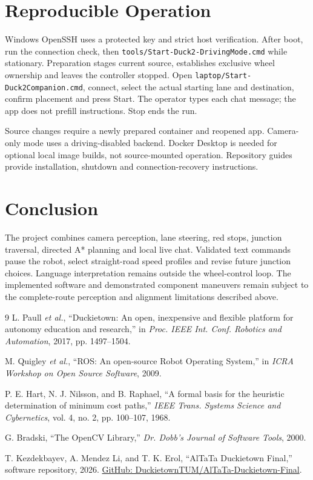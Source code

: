 \documentclass[10pt,a4paper,twocolumn]{article}
\newcommand{\code}[1]{\texttt{#1}}
\begin{document}
\section{Reproducible Operation}

Windows OpenSSH uses a protected key and strict host verification. After boot,
run the connection check, then \code{tools/Start-Duck2-DrivingMode.cmd} while
stationary. Preparation stages current source, establishes exclusive wheel
ownership and leaves the controller stopped. Open
\code{laptop/Start-Duck2Companion.cmd}, connect, select the actual starting lane
and destination, confirm placement and press Start. The operator types each
chat message; the app does not prefill instructions. Stop ends the run.

Source changes require a newly prepared container and reopened app. Camera-only
mode uses a driving-disabled backend. Docker Desktop is needed for optional
local image builds, not source-mounted operation. Repository guides provide
installation, shutdown and connection-recovery instructions.

\section{Conclusion}

The project combines camera perception, lane steering, red stops, junction
traversal, directed A* planning and local live chat. Validated text commands
pause the robot, select straight-road speed profiles and revise future junction
choices. Language interpretation remains outside the wheel-control loop.
The implemented software and demonstrated component maneuvers remain subject
to the complete-route perception and alignment limitations described above.

\begin{thebibliography}{9}
L. Paull \emph{et al.}, ``Duckietown: An open, inexpensive and flexible platform
for autonomy education and research,'' in \emph{Proc. IEEE Int. Conf. Robotics
and Automation}, 2017, pp. 1497--1504.

M. Quigley \emph{et al.}, ``ROS: An open-source Robot Operating System,'' in
\emph{ICRA Workshop on Open Source Software}, 2009.

P. E. Hart, N. J. Nilsson, and B. Raphael, ``A formal basis for the heuristic
determination of minimum cost paths,'' \emph{IEEE Trans. Systems Science and
Cybernetics}, vol. 4, no. 2, pp. 100--107, 1968.

G. Bradski, ``The OpenCV Library,'' \emph{Dr. Dobb's Journal of Software Tools},
2000.

T. Kezdekbayev, A. Mendez Li, and T. K. Erol, ``AlTaTa Duckietown Final,''
software repository, 2026.
\href{https://github.com/DuckietownTUM/AlTaTa-Duckietown-Final}{GitHub: DuckietownTUM/AlTaTa-Duckietown-Final}.
\end{thebibliography}
\end{document}
